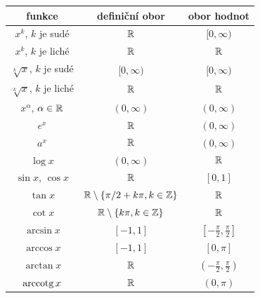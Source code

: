 \begin{table}[H]
    \centering
    \begin{tabular}{||c|c|c||}
        \hline \hline
        funkce & definiční obor & obor hodnot \\
        \hline
        $x^k$, $k$ je sudé              & $\mathbb{R}$          & $[0, \infty)$ \\ 
        $x^k$, $k$ je liché             & $\mathbb{R}$          & $\mathbb{R}$ \\ 
        $\sqrt[k]{x}$, $k$ je sudé      & $[0, \infty)$ & $[0, \infty)$ \\
        $\sqrt[k]{x}$, $k$ je liché     & $\mathbb{R}$          & $\mathbb{R}$ \\
        $x^\alpha$, $\alpha \in \mathbb{R}$     & $(0, \infty)$ & $(0, \infty)$ \\
        $e^x$                           & $\mathbb{R}$          & $(0, \infty)$ \\
        $a^x$                           & $\mathbb{R}$          & $(0, \infty)$ \\
        $\log x$                        & $(0, \infty)$ & $\mathbb{R}$ \\
        $\sin x$, $\cos x$              & $\mathbb{R}$          & $[0,1]$ \\
        $\tan x$                        & $\mathbb{R} \setminus \left \lbrace \pi/2 + k \pi, k \in \mathbb{Z} \right \rbrace$ & $\mathbb{R}$ \\
        $\cot x$                        & $\mathbb{R} \setminus \left \lbrace k \pi, k \in \mathbb{Z} \right \rbrace$  & $\mathbb{R}$ \\
        $\arcsin x$                     & $[-1,1]$      & $[-\frac{\pi}{2}, \frac{\pi}{2}]$ \\
        $\arccos x$                     & $[-1,1]$      & $[0,\pi]$ \\
        $\arctan x$                     & $\mathbb{R}$          & $(-\frac{\pi}{2}, \frac{\pi}{2})$ \\
        $\mathrm{arccotg}\, x$                     & $\mathbb{R}$          & $(0,\pi)$ \\
         \hline \hline
    \end{tabular}
    
\end{table}

